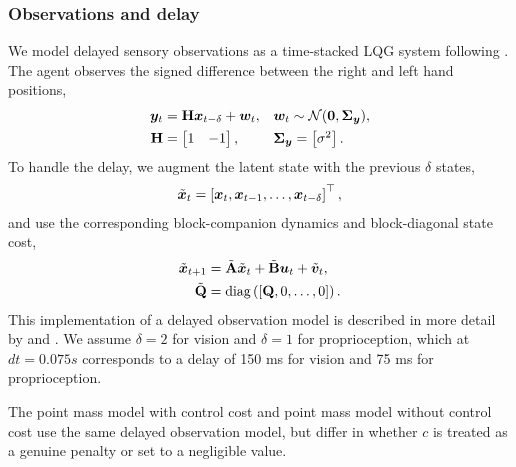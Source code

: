 \documentclass{article}
\begin{document}
\subsubsection{Observations and delay}
We model delayed sensory observations as a time-stacked LQG system following \citet{izawa2008line,crevecoeur2016dynamic}. The agent observes the signed difference between the right and left hand positions,
\begin{align}
    {\bm y}_t &= \mathbf H {\bm x}_{t-\delta} + {\bm w}_t,
    && {\bm w}_t \sim \operatorname{\mathcal{N}}(\mathbf 0, \mathbf \Sigma_{\bm y}), \\
    \mathbf H &= \begin{bmatrix} 1 & -1 \end{bmatrix},
    && \mathbf \Sigma_{\bm y} = \begin{bmatrix} \sigma^2 \end{bmatrix}.
\end{align}
To handle the delay, we augment the latent state with the previous $\delta$ states,
\begin{align}
    \tilde{{\bm x}}_t = \left[{\bm x}_t, {\bm x}_{t-1}, \dots, {\bm x}_{t-\delta}\right]^\top,
\end{align}
and use the corresponding block-companion dynamics and block-diagonal state cost,
\begin{align}
    \tilde{{\bm x}}_{t+1} &= \tilde{\mathbf A} \tilde{{\bm x}}_t + \tilde{\mathbf B} {\bm u}_t + \tilde{{\bm v}}_t, \\
    \tilde{\mathbf Q} &= \text{diag}\left(\left[\mathbf Q, 0, \dots, 0\right]\right).
\end{align}
This implementation of a delayed observation model is described in more detail by \citet{izawa2008line} and \citet{crevecoeur2016dynamic}. We assume $\delta = 2$ for vision and $\delta = 1$ for proprioception, which at $dt = 0.075 s$ corresponds to a delay of 150 ms for vision and 75 ms for proprioception.

The point mass model with control cost and point mass model without control cost use the same delayed observation model, but differ in whether $c$ is treated as a genuine penalty or set to a negligible value.

\end{document}
